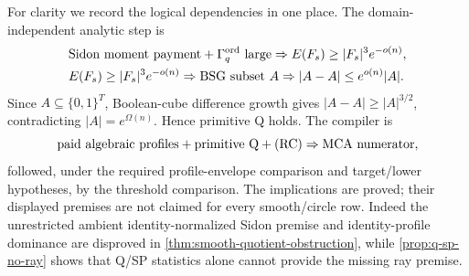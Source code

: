 \documentclass[12pt,a4paper]{amsart}
\numberwithin{equation}{section}
\theoremstyle{remark}
\newcommand{\Gord}{\Gamma^{\rm ord}}
\newcommand{\abs}[1]{\lvert #1\rvert}
\begin{document}
For clarity we record the logical dependencies in one place.  The
domain-independent analytic step is
\[
\begin{aligned}
&\text{Sidon moment payment}+\Gord_q\text{ large}
 \Rightarrow E(F_s)\ge \abs{F_s}^3e^{-o(n)},\\
&E(F_s)\ge \abs{F_s}^3e^{-o(n)}
 \Rightarrow \text{BSG subset }A
 \Rightarrow \abs{A-A}\le e^{o(n)}\abs A.
\end{aligned}
\]
Since \(A\subseteq\{0,1\}^T\), Boolean-cube difference growth gives
\(\abs{A-A}\ge\abs A^{3/2}\), contradicting
\(\abs A=e^{\Omega(n)}\).  Hence primitive Q holds.  The compiler is
\[
 \text{paid algebraic profiles}+\text{primitive Q}+\textup{(RC)}
 \Rightarrow \text{MCA numerator},
\]
followed, under the required profile-envelope comparison and target/lower
hypotheses, by the
threshold comparison.  The implications are proved; their displayed
premises are not claimed for every smooth/circle row.  Indeed the
unrestricted ambient identity-normalized Sidon premise and
identity-profile dominance are disproved in
\cref{thm:smooth-quotient-obstruction}, while
\cref{prop:q-sp-no-ray} shows that Q/SP statistics alone cannot provide
the missing ray premise.
\end{document}

